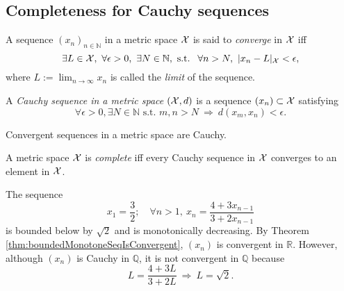 \subsection{Completeness for Cauchy sequences}
\label{sec:completenessCauchySeq}

\begin{defn}
  \label{def:convergenceOfSequenceMetricSpace}
  A sequence $(x_n)_{n\in\mathbb{N}}$ in a metric space ${\cal X}$
  is said to \emph{converge} in ${\cal X}$ iff
  \begin{equation}
    \label{eq:convergenceOfSequenceMetricSpace}
    \exists L\in{\cal X},\ 
    \forall \epsilon>0,\ \exists N\in \mathbb{N}, \text{ s.t. }\ 
    \forall n>N, \ |x_n-L|_{\cal X} < \epsilon,
  \end{equation}
  where $L:=\lim_{n\rightarrow\infty} x_n$
  is called the \emph{limit} of the sequence.
\end{defn}

\begin{defn}
  \label{def:CauchySeqMetricSpace}
  A \emph{Cauchy sequence in a metric space} $({\cal X},d)$
  is a sequence $(x_n)\subset {\cal X}$ satisfying
  \begin{equation}
    \label{eq:CauchySeqMetricSpace}
    \forall \epsilon>0, \exists N\in\mathbb{N} \text{ s.t. }
    m,n > N\ \Rightarrow\ d(x_m,x_n) <\epsilon.
  \end{equation}
\end{defn}

\begin{lem}
  \label{lem:convergentSeqIsCauchyMetric}
  Convergent sequences in a metric space are Cauchy.
\end{lem}

\begin{defn}
  \label{def:completeMetricSpace}  
  A metric space ${\cal X}$ is \emph{complete} iff
  every Cauchy sequence in ${\cal X}$ converges
  to an element in ${\cal X}$.
\end{defn}

\begin{exm}
  \label{exm:QisNotComplete}
  The sequence %
  \begin{equation}
    \label{eq:rationalSeqCauchy}
    x_1=\frac{3}{2};\quad
    \forall n>1,\ x_{n} = \frac{4 + 3 x_{n-1}}{3 + 2 x_{n-1}}
  \end{equation}
  is bounded below by $\sqrt{2}$
  and is monotonically decreasing.
  By Theorem \ref{thm:boundedMonotoneSeqIsConvergent},
  $(x_n)$ is convergent in $\mathbb{R}$.
  However, although $(x_n)$ is Cauchy in $\mathbb{Q}$,
  it is not convergent in $\mathbb{Q}$ because
  \begin{displaymath}
    L = \frac{4+3L}{3+2L} \ \Rightarrow\ 
    L=\sqrt{2}.
  \end{displaymath}
\end{exm}

